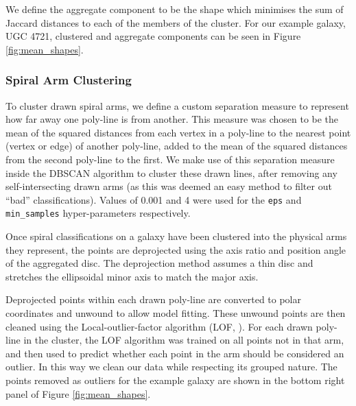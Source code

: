 \documentclass[../main.tex]{subfiles}
\begin{document}
We define the aggregate component to be the shape which minimises the sum of Jaccard distances to each of the members of the cluster. For our example galaxy, UGC 4721, clustered and aggregate components can be seen in Figure \ref{fig:mean_shapes}.

\subsubsection{Spiral Arm Clustering}
\label{sec:spiral_clustering}
To cluster drawn spiral arms, we define a custom separation measure to represent how far away one poly-line is from another. This measure was chosen to be the mean of the squared distances from each vertex in a poly-line to the nearest point (vertex or edge) of another poly-line, added to the mean of the squared distances from the second poly-line to the first. We make use of this separation measure inside the DBSCAN algorithm to cluster these drawn lines, after removing any self-intersecting drawn arms (as this was deemed an easy method to filter out ``bad'' classifications). Values of 0.001 and 4 were used for the \texttt{eps} and \texttt{min\_samples} hyper-parameters respectively.

Once spiral classifications on a galaxy have been clustered into the physical arms they represent, the points are deprojected using the axis ratio and position angle of the aggregated disc. The deprojection method assumes a thin disc and stretches the ellipsoidal minor axis to match the major axis.

Deprojected points within each drawn poly-line are converted to polar coordinates and unwound to allow model fitting. These unwound points are then cleaned using the Local-outlier-factor algorithm (LOF, \citealt{local-outlier-factor}). For each drawn poly-line in the cluster, the LOF algorithm was trained on all points not in that arm, and then used to predict whether each point in the arm should be considered an outlier. In this way we clean our data while respecting its grouped nature. The points removed as outliers for the example galaxy are shown in the bottom right panel of Figure \ref{fig:mean_shapes}.

\begin{figure*}
  \caption{Calculated aggregate components for UGC 4721. The aggregate disc is shown using a dot-dashed line and blue fill in the upper left panel, the aggregate bulge with a dotted line and orange fill in the upper right panel, the aggregate bar using a dashed line and green fill in the lower left panel and the aggregate spiral arms are plotted as red lines in the lower right panel. S\'ersic components are displayed at twice their effective radii. Black crosses in the lower right panel indicate spiral arm points that were identified as outliers and removed during cleaning (described in Section \ref{sec:spiral_clustering}). The aggregated components agree well with the underlying morphology, despite the noisiness of the classifications received.}
  \label{fig:mean_shapes}
\end{figure*}
\end{document}
